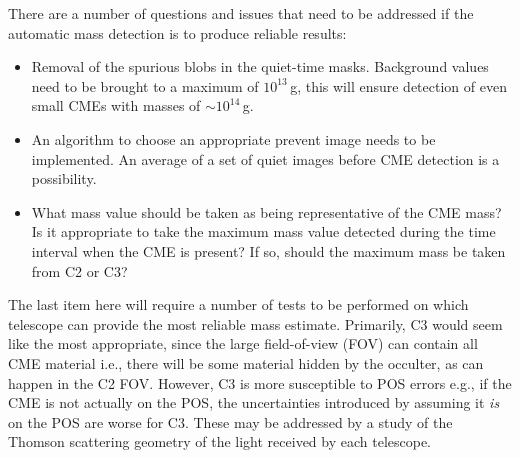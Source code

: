 There are a number of questions and issues that need to be addressed if the automatic mass detection is to produce reliable results:
\begin{itemize}
\item Removal of the spurious blobs in the quiet-time masks. Background values need to be brought to a maximum of $10^{13}$\,g, this will ensure detection of even small CMEs with masses of $\sim$$10^{14}$\,g.
\item An algorithm to choose an appropriate prevent image needs to be implemented. An average of a set of quiet images before CME detection is a possibility. 
\item What mass value should be taken as being representative of the CME mass? Is it appropriate to take the maximum mass value detected during the time interval when the CME is present? If so, should the maximum mass be taken from C2 or C3?
\end{itemize}
The last item here will require a number of tests to be performed on which telescope can provide the most reliable mass estimate. Primarily, C3 would seem like the most appropriate, since the large field-of-view (FOV) can contain all CME material i.e., there will be some material hidden by the occulter, as can happen in the C2 FOV. However, C3 is more susceptible to POS errors e.g., if the CME is not actually on the POS, the uncertainties introduced by assuming it \emph{is} on the POS are worse for C3. 
These may be addressed by a study of the Thomson scattering geometry of the light received by each telescope.

